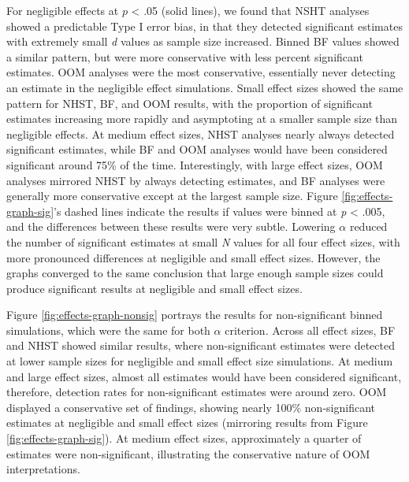 \documentclass[,man, mask]{apa6}
\begin{document}
For negligible effects at \(p\) \textless{} .05 (solid lines), we found that NSHT analyses showed a predictable Type I error bias, in that they detected significant estimates with extremely small \emph{d} values as sample size increased. Binned BF values showed a similar pattern, but were more conservative with less percent significant estimates. OOM analyses were the most conservative, essentially never detecting an estimate in the negligible effect simulations. Small effect sizes showed the same pattern for NHST, BF, and OOM results, with the proportion of significant estimates increasing more rapidly and asymptoting at a smaller sample size than negligible effects. At medium effect sizes, NHST analyses nearly always detected significant estimates, while BF and OOM analyses would have been considered significant around 75\% of the time. Interestingly, with large effect sizes, OOM analyses mirrored NHST by always detecting estimates, and BF analyses were generally more conservative except at the largest sample size. Figure \ref{fig:effects-graph-sig}'s dashed lines indicate the results if values were binned at \emph{p} \textless{} .005, and the differences between these results were very subtle. Lowering \(\alpha\) reduced the number of significant estimates at small \emph{N} values for all four effect sizes, with more pronounced differences at negligible and small effect sizes. However, the graphs converged to the same conclusion that large enough sample sizes could produce significant results at negligible and small effect sizes.

Figure \ref{fig:effects-graph-nonsig} portrays the results for non-significant binned simulations, which were the same for both \(\alpha\) criterion. Across all effect sizes, BF and NHST showed similar results, where non-significant estimates were detected at lower sample sizes for negligible and small effect size simulations. At medium and large effect sizes, almost all estimates would have been considered significant, therefore, detection rates for non-significant estimates were around zero. OOM displayed a conservative set of findings, showing nearly 100\% non-significant estimates at negligible and small effect sizes (mirroring results from Figure \ref{fig:effects-graph-sig}). At medium effect sizes, approximately a quarter of estimates were non-significant, illustrating the conservative nature of OOM interpretations.
\end{document}
